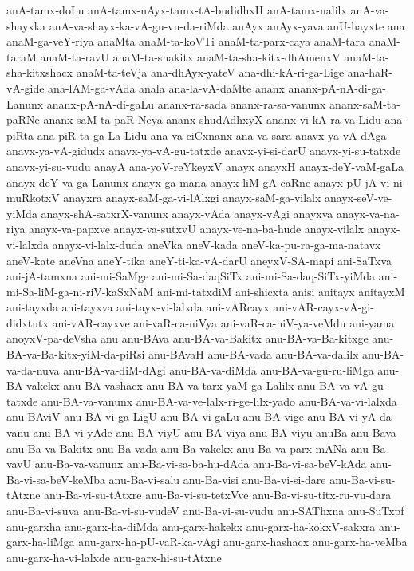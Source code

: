 {anA-tamx-doLu
anA-tamx-nAyx-tamx-tA-budidhxH
anA-tamx-nalilx
anA-va-shayxka
anA-va-shayx-ka-vA-gu-vu-da-riMda
anAyx
anAyx-yava
anU-hayxte
ana
anaM-ga-veY-riya
anaMta
anaM-ta-koVTi
anaM-ta-parx-caya
anaM-tara
anaM-taraM
anaM-ta-ravU
anaM-ta-shakitx
anaM-ta-sha-kitx-dhAmenxV
anaM-ta-sha-kitxshacx
anaM-ta-teVja
ana-dhAyx-yateV
ana-dhi-kA-ri-ga-Lige
ana-haR-vA-gide
ana-lAM-ga-vAda
anala
ana-la-vA-daMte
ananx
ananx-pA-nA-di-ga-Lanunx
ananx-pA-nA-di-gaLu
ananx-ra-sada
ananx-ra-sa-vanunx
ananx-saM-ta-paRNe
ananx-saM-ta-paR-Neya
ananx-shudAdhxyX
ananx-vi-kA-ra-va-Lidu
ana-piRta
ana-piR-ta-ga-La-Lidu
ana-va-ciCxnanx
ana-va-sara
anavx-ya-vA-dAga
anavx-ya-vA-gidudx
anavx-ya-vA-gu-tatxde
anavx-yi-si-darU
anavx-yi-su-tatxde
anavx-yi-su-vudu
anayA
ana-yoV-reYkeyxV
anayx
anayxH
anayx-deY-vaM-gaLa
anayx-deY-va-ga-Lanunx
anayx-ga-mana
anayx-liM-gA-caRne
anayx-pU-jA-vi-ni-muRkotxV
anayxra
anayx-saM-ga-vi-lAlxgi
anayx-saM-ga-vilalx
anayx-seV-ve-yiMda
anayx-shA-satxrX-vanunx
anayx-vAda
anayx-vAgi
anayxva
anayx-va-na-riya
anayx-va-papxve
anayx-va-sutxvU
anayx-ve-na-ba-hude
anayx-vilalx
anayx-vi-lalxda
anayx-vi-lalx-duda
aneVka
aneV-kada
aneV-ka-pu-ra-ga-ma-natavx
aneV-kate
aneVna
aneY-tika
aneY-ti-ka-vA-darU
aneyxV-SA-mapi
ani-SaTxva
ani-jA-tamxna
ani-mi-SaMge
ani-mi-Sa-daqSiTx
ani-mi-Sa-daq-SiTx-yiMda
ani-mi-Sa-liM-ga-ni-riV-kaSxNaM
ani-mi-tatxdiM
ani-shicxta
anisi
anitayx
anitayxM
ani-tayxda
ani-tayxva
ani-tayx-vi-lalxda
ani-vARcayx
ani-vAR-cayx-vA-gi-didxtutx
ani-vAR-cayxve
ani-vaR-ca-niVya
ani-vaR-ca-niV-ya-veMdu
ani-yama
anoyxV-pa-deVsha
anu
anu-BAva
anu-BA-va-Bakitx
anu-BA-va-Ba-kitxge
anu-BA-va-Ba-kitx-yiM-da-piRsi
anu-BAvaH
anu-BA-vada
anu-BA-va-dalilx
anu-BA-va-da-nuva
anu-BA-va-diM-dAgi
anu-BA-va-diMda
anu-BA-va-gu-ru-liMga
anu-BA-vakekx
anu-BA-vashacx
anu-BA-va-tarx-yaM-ga-Lalilx
anu-BA-va-vA-gu-tatxde
anu-BA-va-vanunx
anu-BA-va-ve-lalx-ri-ge-lilx-yado
anu-BA-va-vi-lalxda
anu-BAviV
anu-BA-vi-ga-LigU
anu-BA-vi-gaLu
anu-BA-vige
anu-BA-vi-yA-da-vanu
anu-BA-vi-yAde
anu-BA-viyU
anu-BA-viya
anu-BA-viyu
anuBa
anu-Bava
anu-Ba-va-Bakitx
anu-Ba-vada
anu-Ba-vakekx
anu-Ba-va-parx-mANa
anu-Ba-vavU
anu-Ba-va-vanunx
anu-Ba-vi-sa-ba-hu-dAda
anu-Ba-vi-sa-beV-kAda
anu-Ba-vi-sa-beV-keMba
anu-Ba-vi-salu
anu-Ba-visi
anu-Ba-vi-si-dare
anu-Ba-vi-su-tAtxne
anu-Ba-vi-su-tAtxre
anu-Ba-vi-su-tetxVve
anu-Ba-vi-su-titx-ru-vu-dara
anu-Ba-vi-suva
anu-Ba-vi-su-vudeV
anu-Ba-vi-su-vudu
anu-SAThxna
anu-SuTxpf
anu-garxha
anu-garx-ha-diMda
anu-garx-hakekx
anu-garx-ha-kokxV-sakxra
anu-garx-ha-liMga
anu-garx-ha-pU-vaR-ka-vAgi
anu-garx-hashacx
anu-garx-ha-veMba
anu-garx-ha-vi-lalxde
anu-garx-hi-su-tAtxne
}

